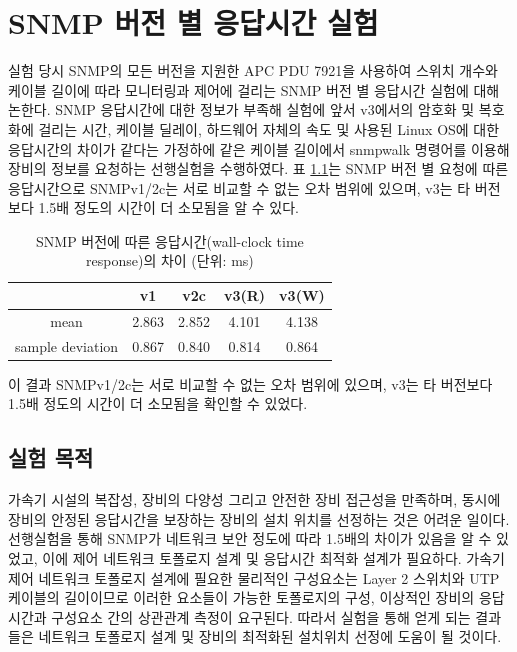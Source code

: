 \documentclass[11pt
  , a4paper
  , article
  , oneside
]{memoir}
\begin{document}
\clearpage

\chapter{SNMP 버전 별 응답시간 실험}
실험 당시 SNMP의 모든 버전을 지원한 APC PDU 7921을 사용하여 스위치 개수와 케이블 길이에 따라 모니터링과 제어에 걸리는 SNMP 버전 별 응답시간 실험에 대해 논한다. SNMP 응답시간에 대한 정보가 부족해 실험에 앞서 v3에서의 암호화 및 복호화에 걸리는 시간, 케이블 딜레이, 하드웨어 자체의 속도 및 사용된 Linux OS에 대한 응답시간의 차이가 같다는 가정하에 같은 케이블 길이에서 snmpwalk 명령어를 이용해 장비의 정보를 요청하는 선행실험을 수행하였다. 표 \ref{table:test}는 SNMP 버전 별 요청에 따른 응답시간으로 SNMPv1/2c는 서로 비교할 수 없는 오차 범위에 있으며, v3는 타 버전보다 1.5배 정도의 시간이 더 소모됨을 알 수 있다. 

\begin{table}[h!]
\begin{center}
\begin{tabular}{c|c|c|c|c}\hline
 & v1 & v2c & v3(R) & v3(W) \\ \hline
mean & 2.863 & 2.852 & 4.101 & 4.138 \\ \hline
sample deviation & 0.867 & 0.840 & 0.814 & 0.864 \\ \hline
\end{tabular}
\caption{SNMP 버전에 따른 응답시간(wall-clock time response)의 차이 (단위: ms)}
  \label{table:test}  
\end{center}
\end{table}
이 결과 SNMPv1/2c는 서로 비교할 수 없는 오차 범위에 있으며, v3는 타 버전보다 1.5배 정도의 시간이 더 소모됨을 확인할 수 있었다.

\section{실험 목적}
가속기 시설의 복잡성, 장비의 다양성 그리고 안전한 장비 접근성을 만족하며, 동시에 장비의 안정된 응답시간을 보장하는 장비의 설치 위치를 선정하는 것은 어려운 일이다. 선행실험을 통해 SNMP가 네트워크 보안 정도에 따라 1.5배의 차이가 있음을 알 수 있었고, 이에 제어 네트워크 토폴로지 설계 및 응답시간 최적화 설계가 필요하다. 가속기 제어 네트워크 토폴로지 설계에 필요한 물리적인 구성요소는 Layer 2 스위치와 UTP 케이블의 길이이므로 이러한 요소들이 가능한 토폴로지의 구성, 이상적인 장비의 응답시간과 구성요소 간의 상관관계 측정이 요구된다. 따라서 실험을 통해 얻게 되는 결과들은 네트워크 토폴로지 설계 및 장비의 최적화된 설치위치 선정에 도움이 될 것이다.
\end{document}
